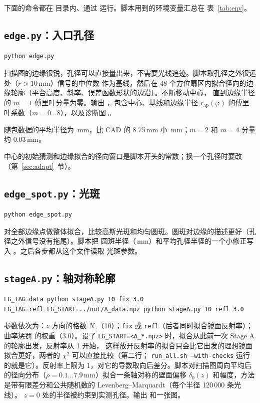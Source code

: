 \documentclass[11pt,a4paper,fontset=fandol]{ctexart}
\newcommand{\code}[1]{\texttt{#1}}
\begin{document}
下面的命令都在  目录内、通过  运行。脚本用到的环境变量汇总在
表~\ref{tab:env}。

\subsection{\texttt{edge.py}：入口孔径}

\begin{lstlisting}
python edge.py
\end{lstlisting}
扫描图的边缘很锐，孔径可以直接量出来，不需要光线追迹。脚本取孔径之外很远处（$r>10$\,mm）信号的中位数
作为基线，然后在 48 个方位扇区内拟合径向的边缘轮廓（平台高度、斜率、误差函数形状的边沿）。不断移动中心，
直到边缘半径的 $m=1$ 傅里叶分量为零。输出 ，包含中心、基线和边缘半径
$r_\mathrm{ap}(\varphi)$ 的傅里叶系数（$m=0\ldots8$），以及诊断图 。

随包数据的平均半径为 \RAp\,mm，比 CAD 的 8.75\,mm 小 \RApDiff\,mm；$m=2$ 和 $m=4$ 分量约 0.03\,mm。

中心的初始猜测和边缘拟合的径向窗口是脚本开头的常数；换一个孔径时要改
（第~\ref{sec:adapt}~节）。

\subsection{\texttt{edge\_spot.py}：光斑}

\begin{lstlisting}
python edge_spot.py
\end{lstlisting}
对全部边缘点做整体拟合，比较高斯光斑和均匀圆斑。圆斑对边缘的描述更好（孔径之外信号没有拖尾）。脚本把
圆斑半径（\SpotR\,mm）和平均孔径半径的一个小修正写入 。之后各步都从这个文件读取
光斑参数。

\subsection{\texttt{stageA.py}：轴对称轮廓}

\begin{lstlisting}
LG_TAG=data python stageA.py 10 fix 3.0
LG_TAG=refl LG_START=../out/A_data.npz python stageA.py 10 refl 3.0
\end{lstlisting}
参数依次为：$z$ 方向的格数 $N_z$（10）；\code{fix} 或 \code{refl}（后者同时拟合镜面反射率）；曲率惩罚
的权重（3.0）。设了 \code{LG\_START=<A\_*.npz>} 时，拟合从此前一次 Stage A 的轮廓出发，反射率从 1 开始，
这样放开反射率的拟合只会比它出发的理想镜面拟合更好，两者的 $\chi^2$ 可以直接比较（第二行；
\code{run\_all.sh --with-checks} 运行的就是它）。反射率上限为 1，对它的导数取向后差分。脚本对扫描图周向平均后的径向分布（$\rho=0.1\ldots7.9$\,mm）拟合一条轴对称的壁面偏移
$\delta_0(z)$ 和幅度，方法是带有限差分和公共随机数的 Levenberg--Marquardt（每个半径 120\,000 条光线）。
$z=0$ 处的半径被约束到实测孔径。输出  和一张图。
\end{document}
